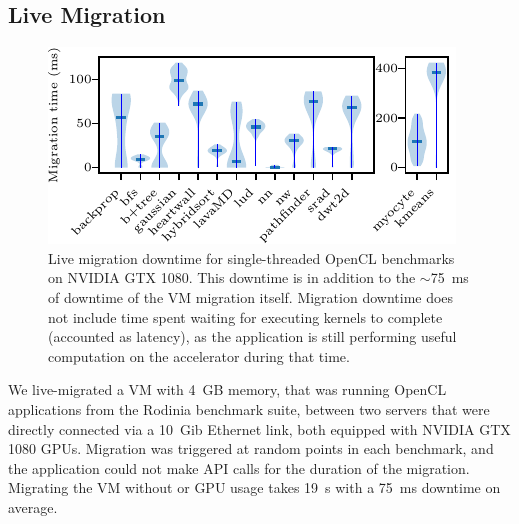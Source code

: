 \subsection{Live Migration}

\begin{figure}
	\centering
	\includegraphics[width=\columnwidth]{ava/data/migration/time_plot.pdf}%
	\caption{Live migration downtime for single-threaded OpenCL benchmarks on NVIDIA GTX 1080.
      This downtime is in addition to the $\sim$\SI{75}{\milli\second} of downtime of the VM migration itself.
      Migration downtime does not include time spent waiting for executing kernels to complete (accounted as latency), as the application is still performing useful computation on the accelerator during that time.
    }
	\label{fig:migration}
\end{figure}

We live-migrated a VM with 4~GB memory, that was running OpenCL applications from the Rodinia benchmark suite, between two servers that were directly connected via a 10~Gib Ethernet link, both equipped with NVIDIA GTX 1080 GPUs.
Migration was triggered at random points in each benchmark, and the application could not make API calls for the duration of the migration.
Migrating the VM without \model or GPU usage takes \SI{19}{\second} with a \SI{75}{\milli\second} downtime on average.


